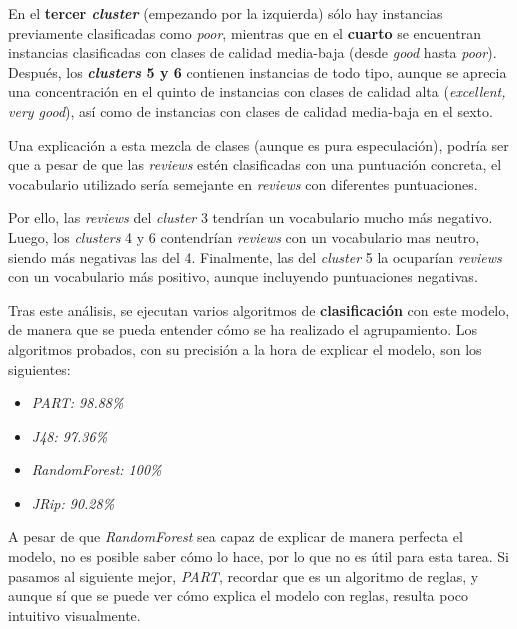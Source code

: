 \documentclass[12pt,a4paper, xcolor=table]{article}
\begin{document}
En el \textbf{tercer \textit{cluster}} (empezando por la izquierda) sólo hay instancias previamente clasificadas como \textit{poor}, mientras que en el \textbf{cuarto} se encuentran instancias clasificadas con clases de calidad media-baja (desde \textit{good} hasta \textit{poor}). Después, los \textbf{\textit{clusters} 5 y 6} contienen instancias de todo tipo, aunque se aprecia una concentración en el quinto de instancias con clases de calidad alta (\textit{excellent, very good}), así como de instancias con clases de calidad media-baja en el sexto.

\vspace{3mm}

Una explicación a esta mezcla de clases (aunque es pura especulación), podría ser que a pesar de que las \textit{reviews} estén clasificadas con una puntuación concreta, el vocabulario utilizado sería semejante en \textit{reviews} con diferentes puntuaciones.

 \vspace{1mm}

Por ello, las \textit{reviews} del \textit{cluster} 3 tendrían un vocabulario mucho más negativo. Luego, los \textit{clusters} 4 y 6 contendrían \textit{reviews} con un vocabulario mas neutro, siendo más negativas las del 4. Finalmente, las del \textit{cluster} 5 la ocuparían \textit{reviews} con un vocabulario más positivo, aunque incluyendo puntuaciones negativas.

\vspace{4mm}

Tras este análisis, se ejecutan varios algoritmos de \textbf{clasificación} con este modelo, de manera que se pueda entender cómo se ha realizado el agrupamiento. Los algoritmos probados, con su precisión a la hora de explicar el modelo, son los siguientes:

\begin{itemize}
    \item \textit{PART: 98.88\%}
    \item \textit{J48: 97.36\%}
    \item \textit{RandomForest: 100\%}
    \item \textit{JRip: 90.28\%}
\end{itemize}

A pesar de que \textit{RandomForest} sea capaz de explicar de manera perfecta el modelo, no es posible saber cómo lo hace, por lo que no es útil para esta tarea. Si pasamos al siguiente mejor, \textit{PART}, recordar que es un algoritmo de reglas, y aunque sí que se puede ver cómo explica el modelo con reglas, resulta poco intuitivo visualmente.
\end{document}
